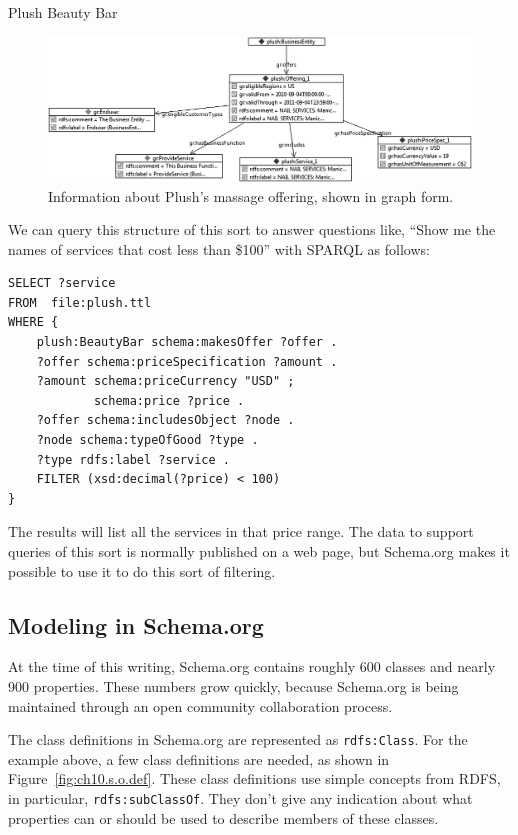 \begin{example}{Plush Beauty Bar}
\begin{figure}
\centering
\includegraphics[width=5in]{media/ch14/f14-02.png}
\caption{Information about Plush's massage offering, shown in graph form.}
\label{fig:ch10.02}
\end{figure}



We can query this structure of this sort to answer questions like,
``Show me the names of services that
cost less than \$100'' with SPARQL as follows:

\begin{lstlisting}
SELECT ?service 
FROM  file:plush.ttl
WHERE {
    plush:BeautyBar schema:makesOffer ?offer . 
    ?offer schema:priceSpecification ?amount .
    ?amount schema:priceCurrency "USD" ;
            schema:price ?price .
    ?offer schema:includesObject ?node .
    ?node schema:typeOfGood ?type .
    ?type rdfs:label ?service .
    FILTER (xsd:decimal(?price) < 100)
}
\end{lstlisting}


The results will list all the services in that price range.  The data to 
support queries of this sort is normally published on a web page, 
but Schema.org makes it possible to use it to do this sort of filtering. 
\end{example}





\subsection{Modeling in Schema.org}


At the time of this writing, Schema.org contains roughly 600 classes and nearly 
900 properties.  These numbers grow quickly, because Schema.org is being
maintained through an open community collaboration process. 

The class definitions in Schema.org are represented as \texttt{rdfs:Class}.  
For the 
example above, a few class definitions are needed, as shown in Figure~\ref{fig:ch10.s.o.def}.  These class definitions use simple concepts from RDFS, in particular, 
\texttt{rdfs:subClassOf}.  They don't give any indication about what
properties can or should be used to describe members of these classes. 


